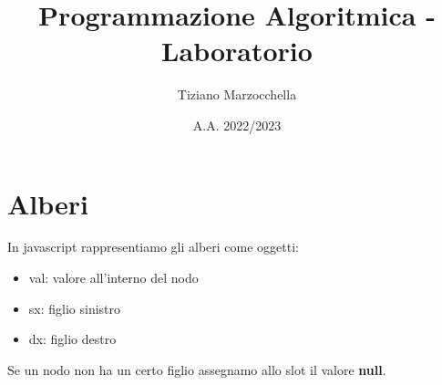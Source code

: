 \documentclass{article}
\title{Programmazione Algoritmica - Laboratorio}
\author{Tiziano Marzocchella}
\date{A.A. 2022/2023}
\begin{document}


\section{Alberi}
In javascript rappresentiamo gli alberi come oggetti:

\begin{itemize}
    \item val: valore all'interno del nodo
    \item sx: figlio sinistro
    \item dx: figlio destro
\end{itemize}

Se un nodo non ha un certo figlio assegnamo allo slot il valore \textbf{null}.
\end{document}
